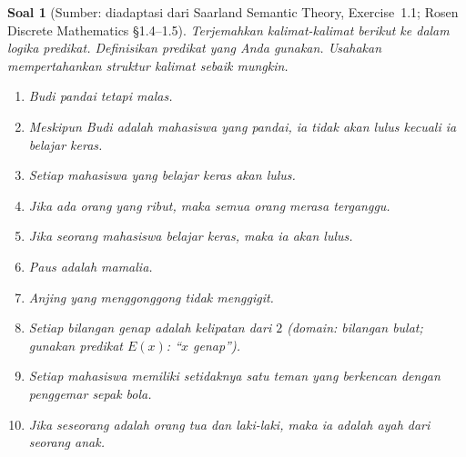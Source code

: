 \documentclass[12pt,a4paper]{article}
\theoremstyle{soaljarak}
\newtheorem{soal}{Soal}
\begin{document}
\begin{soal}[\normalfont Sumber: diadaptasi dari Saarland Semantic Theory, Exercise~1.1; Rosen Discrete Mathematics §1.4--1.5]
  Terjemahkan kalimat-kalimat berikut ke dalam logika predikat.
  Definisikan predikat yang Anda gunakan.
  Usahakan mempertahankan struktur kalimat sebaik mungkin.
  \begin{enumerate}
    \item Budi pandai tetapi malas.
    \item Meskipun Budi adalah mahasiswa yang pandai, ia tidak akan lulus kecuali ia belajar keras.
    \item Setiap mahasiswa yang belajar keras akan lulus.
    \item Jika ada orang yang ribut, maka semua orang merasa terganggu.
    \item Jika seorang mahasiswa belajar keras, maka ia akan lulus.
    \item Paus adalah mamalia.
    \item Anjing yang menggonggong tidak menggigit.
    \item Setiap bilangan genap adalah kelipatan dari \(2\) (domain: bilangan bulat; gunakan predikat \(E(x)\): ``\(x\) genap'').
    \item Setiap mahasiswa memiliki setidaknya satu teman yang berkencan dengan penggemar sepak bola.
    \item Jika seseorang adalah orang tua dan laki-laki, maka ia adalah ayah dari seorang anak.
  \end{enumerate}
\end{soal}
\end{document}
